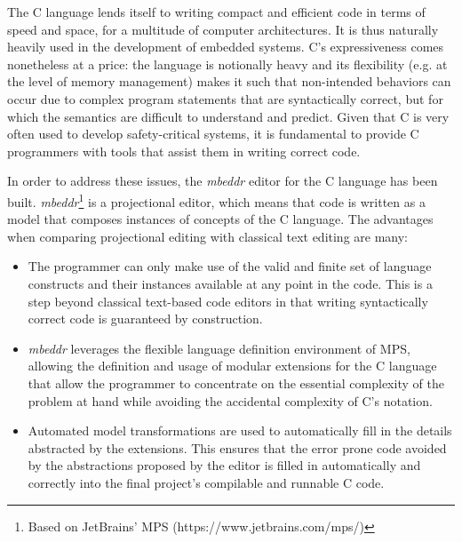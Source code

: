 The C language lends itself to writing compact and efficient code in terms of
speed and space, for a multitude of computer architectures. It is thus naturally
heavily used in the development of embedded systems. C's expressiveness comes
nonetheless at a price: the language is notionally
heavy and its flexibility (e.g. at the level of memory management) makes it such that non-intended
behaviors can occur due to complex program statements that are syntactically
correct, but for which the semantics are difficult to understand and predict.
Given that C is very often used to develop safety-critical systems, it is
fundamental to provide C programmers with tools that assist them in writing
correct code.

In order to address these issues, the \emph{mbeddr} editor for the C language has been
built\cite{SzaboVKRS14}. \emph{mbeddr}\footnote{Based on JetBrains’ MPS
(https://www.jetbrains.com/mps/)} is a projectional editor, which means that
code is written as a model that composes instances of concepts of the C
language. The advantages when comparing projectional editing with classical text
editing are many:

\begin{itemize}
  \item The programmer can only make use of the valid and finite set of language
  constructs and their instances available at any point in the code. This is a
  step beyond classical text-based code editors in that writing syntactically
  correct code is guaranteed by construction.
  \item \emph{mbeddr} leverages the flexible language definition environment of MPS,
  allowing the definition and usage of modular extensions for the C language
  that allow the programmer to concentrate on the essential complexity of the problem
  at hand while avoiding the accidental complexity of C’s notation.
  \item Automated model transformations are used to automatically fill in the
  details abstracted by the extensions. This ensures that the error prone code
  avoided by the abstractions proposed by the editor is filled in automatically
  and correctly into the final project’s compilable and runnable C code.
\end{itemize}
